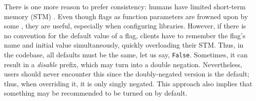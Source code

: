 There is one more reason to prefer consistency: humans have limited short-term memory (STM) \cite{miller1956magical}. Even though flags as function parameters are frowned upon by some \cite{martin2009clean}, they are useful, especially when configuring libraries. However, if there is no convention for the default value of a flag, clients have to remember the flag's name and initial value simultaneously, quickly overloading their STM. Thus, in the codebase, all defaults must be the same, let us say, \texttt{False}. Sometimes, it can result in a \textit{disable} prefix, which may turn into a double negation. Nevertheless, users should never encounter this since the doubly-negated version is the default; thus, when overriding it, it is only singly negated. This approach also implies that something may be recommended to be turned on by default.
